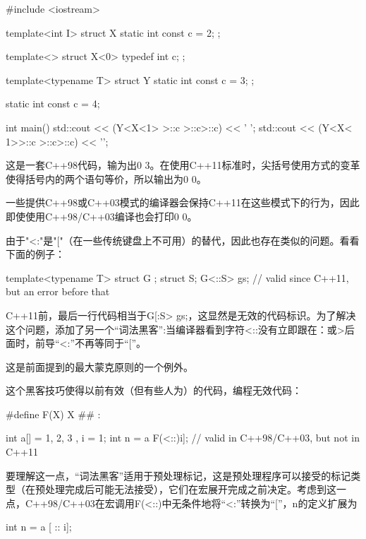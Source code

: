 \begin{cpp}
#include <iostream>

template<int I> struct X {
	static int const c = 2;
};

template<> struct X<0> {
	typedef int c;
};

template<typename T> struct Y {
	static int const c = 3;
};

static int const c = 4;

int main() {
	std::cout << (Y<X<1> >::c >::c>::c) << ' ';
	std::cout << (Y<X< 1>>::c >::c>::c) << '\n';
}
\end{cpp}

这是一套C++98代码，输为出0 3。在使用C++11标准时，尖括号使用方式的变革使得括号内的两个语句等价，所以输出为0 0。

\begin{notice}
一些提供C++98或C++03模式的编译器会保持C++11在这些模式下的行为，因此即使使用C++98/C++03编译也会打印0 0。
\end{notice}

由于"<:"是"["（在一些传统键盘上不可用）的替代，因此也存在类似的问题。看看下面的例子：

\begin{cpp}
template<typename T> struct G {};
struct S;
G<::S> gs; // valid since C++11, but an error before that
\end{cpp}

C++11前，最后一行代码相当于G[:S> gs;，这显然是无效的代码标识。为了解决这个问题，添加了另一个“词法黑客”:当编译器看到字符<::没有立即跟在：或>后面时，前导“<:”不再等同于“[”。

\begin{notice}
这是前面提到的最大蒙克原则的一个例外。
\end{notice}

这个黑客技巧使得以前有效（但有些人为）的代码，编程无效代码：

\begin{cpp}
#define F(X) X ## :

int a[] = { 1, 2, 3 }, i = 1;
int n = a F(<::)i]; // valid in C++98/C++03, but not in C++11
\end{cpp}

要理解这一点，“词法黑客”适用于预处理标记，这是预处理程序可以接受的标记类型（在预处理完成后可能无法接受），它们在宏展开完成之前决定。考虑到这一点，C++98/C++03在宏调用F(<::)中无条件地将“<:”转换为“[”，n的定义扩展为

\begin{cpp}
int n = a [ :: i];
\end{cpp}

